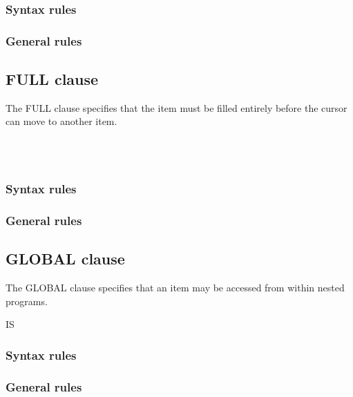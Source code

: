 \subsubsection{Syntax rules}

\subsubsection{General rules}

\subsection{FULL clause}

The FULL clause specifies that the item must be filled entirely before the cursor can move to another item.

\begin{syntax}
  \begin{1=}
     \\
     \\
  \end{1=}
\end{syntax}

\subsubsection{Syntax rules}

\subsubsection{General rules}

\subsection{GLOBAL clause}

The GLOBAL clause specifies that an item may be accessed from within nested programs.

\begin{syntax}
  IS 
\end{syntax}

\subsubsection{Syntax rules}

\subsubsection{General rules}

